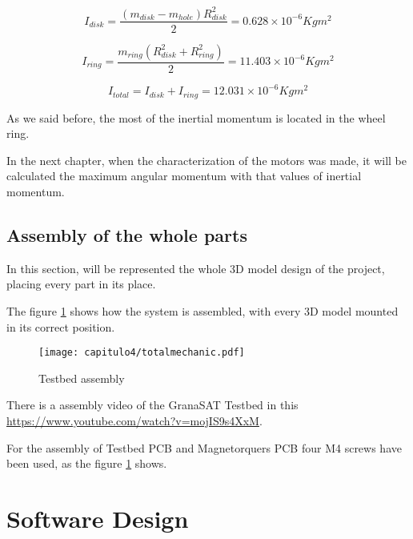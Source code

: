 \begin{equation}
I_{disk} =  \frac{(m_{disk}-m_{hole})R^2_{disk}}{2}= 0.628\times 10^{-6} Kg m^2
\label{eq:Idisk}
\end{equation}

\begin{equation}
I_{ring} =  \frac{m_{ring}(R^2_{disk}+R^2_{ring})}{2}= 11.403\times 10^{-6} Kg m^2
\label{eq:Iring}
\end{equation}

\begin{equation}
I_{total} = I_{disk}+I_{ring}= 12.031\times 10^{-6} Kg m^2
\label{eq:inertial}
\end{equation}

As we said before, the most of the inertial momentum is located in the wheel ring.

In the next chapter, when the characterization of the motors was made, it will be calculated the maximum angular momentum with that values of inertial momentum.


\subsection{Assembly of the whole parts} \label{ssec:airbearing}

In this section, will be represented the whole 3D model design of the project, placing every part in its place.

The figure \ref{fig:totalmechanic} shows how the system is assembled, with every 3D model mounted in its correct position. 

\begin{figure}[H]
	\centering
		\texttt{[image: capitulo4/totalmechanic.pdf]}
	\caption{Testbed assembly}
	\label{fig:totalmechanic}
\end{figure}

There is a assembly video of the GranaSAT Testbed in this \url{https://www.youtube.com/watch?v=mojIS9s4XxM}.


For the assembly of Testbed \acrshort{PCB} and Magnetorquers \acrshort{PCB} four M4 screws have been used, as the figure \ref{fig:totalmechanic} shows.

\section{Software Design} \label{sec:softwaredesign}

